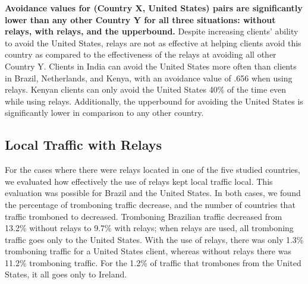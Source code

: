 {\bf Avoidance values for (Country X, United States) pairs are significantly lower than any other Country Y for all three situations: without relays, with relays, and the upperbound.}   Despite increasing clients' ability to avoid the United States, relays are not as effective at helping clients avoid this country as compared to the effectiveness of the relays at avoiding all other Country Y.  Clients in India can avoid the United States more often than clients in Brazil, Netherlands, and Kenya, with an avoidance value of .656 when using relays.  Kenyan clients can only avoid the United States 40\% of the time even while using relays.  Additionally, the upperbound for avoiding the United States is significantly lower in comparison to any other country.  

\subsection{Local Traffic with Relays}
For the cases where there were relays located in one of the five studied countries, we evaluated how effectively the use of relays kept local traffic local.  This evaluation was possible for Brazil and the United States.  In both cases, we found the percentage of tromboning traffic decrease, and the number of countries that traffic tromboned to decreased.  Tromboning Brazilian traffic decreased from 13.2\% without relays to 9.7\% with relays; when relays are used, all tromboning traffic goes only to the United States.  With the use of relays, there was only 1.3\% tromboning traffic for a United States client, whereas without relays there was 11.2\% tromboning traffic.  For the 1.2\% of traffic that trombones from the United States, it all goes only to Ireland.
